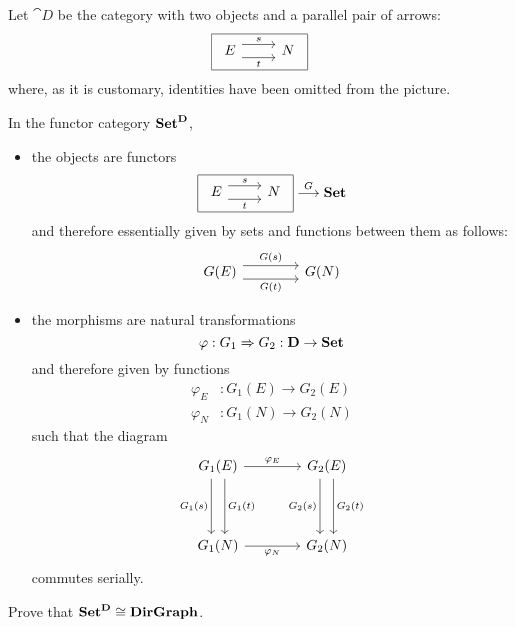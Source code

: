 \begin{example}
Let $\cat D$ be the category with two objects and a parallel pair of arrows:
\[
  \begin{array}{|c|}\hline 
  \begin{tikzcd}
    E
      \arrow[shift left=+2, "s"above]{r}
      \arrow[shift left=-2, "t"below]{r}
    &
    N %
  \end{tikzcd}
  \\ \hline \end{array}
\]
where, as it is customary, identities have been omitted from the picture.

In the functor category $\mathbf {Set}^{\mathbf D}$, 
\begin{itemize}
\item
the objects are functors
\[
  \begin{array}{|c|}\hline 
  \begin{tikzcd}
  E \arrow[shift left=+2, "s"above]{r} \arrow[shift left=-2, "t"below]{r} 
  & N
  \end{tikzcd}
  \\ \hline \end{array}
  \overset G\longrightarrow 
  \catset 
\]
and therefore essentially given by sets and functions between them as follows:
\[
  \begin{tikzcd}[sep=4em]
  G(E) \arrow[shift left=+2, "G(s)"above]{r} 
  \arrow[shift left=-2, "G(t)"below]{r} & G(N)
  \end{tikzcd}
\]

\item
the morphisms are natural transformations
\[
  \varphi : G_1 \Rightarrow G_2 : \mathbf D\to \mathbf {Set}
\]
and therefore given by functions 
\begin{align*}
  \varphi_E &: G_1(E) \longrightarrow G_2(E)
  \\[1mm]
  \varphi_N &: G_1(N) \longrightarrow G_2(N)
\end{align*}
such that the diagram
\[\begin{tikzcd}[sep=4em]
    G_1(E)
      \arrow["\varphi_E"]{r}
      \arrow[shift left=+2, "G_1(t)"right]{d}
      \arrow[shift left=-2, "G_1(s)"left]{d}
    &
    G_2(E)
    \arrow[shift left=+2, "G_2(t)"right]{d} 
    \arrow[shift left=-2, "G_2(s)"left]{d}
    \\
    G_1(N)
    \arrow["\varphi_N",swap]{r}
    &
    G_2(N)
\end{tikzcd}\]
commutes serially.
\end{itemize}
\end{example}

\begin{exercise}
Prove that $\mathbf {Set}^{\mathbf D} \cong \mathbf {DirGraph}$.
\end{exercise}

